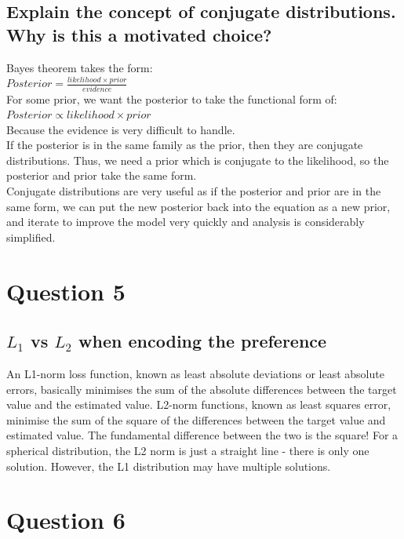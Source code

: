 \documentclass[a4paper, 9pt]{article}
\begin{document}
\subsection*{Explain the concept of conjugate distributions. Why is this a motivated choice?}
Bayes theorem takes the form: \\
\newline
\( Posterior = \frac{likelihood \times prior}{evidence} \) \\
\newline
For some prior, we want the posterior to take the functional form of: \\
\newline
\( Posterior \propto likelihood \times prior \) \\
\newline
Because the evidence is very difficult to handle. \\
\newline
If the posterior is in the same family as the prior, then they are conjugate distributions. Thus, we need a prior which is conjugate to the likelihood, so the posterior and prior take the same form. \\
Conjugate distributions are very useful as if the posterior and prior are in the same form, we can put the new posterior back into the equation as a new prior, and iterate to improve the model very quickly and analysis is considerably simplified.

\section*{Question 5}
\subsection*{\( L_{1} \) vs \( L_{2} \) when encoding the preference}
An L1-norm loss function, known as least absolute deviations or least absolute errors, basically minimises the sum of the absolute differences between the target value and the estimated value. L2-norm functions, known as least squares error, minimise the sum of the square of the differences between the target value and estimated value. The fundamental difference between the two is the square! 
For a spherical distribution, the L2 norm is just a straight line - there is only one solution. However, the L1 distribution may have multiple solutions.

\section*{Question 6}
\end{document}
